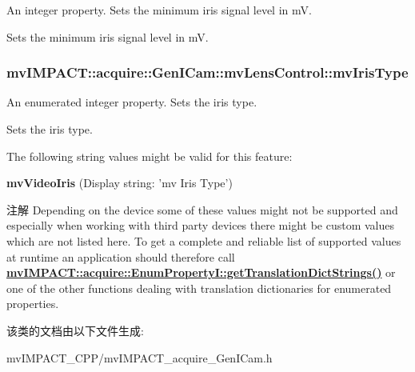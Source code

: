 An integer property. Sets the minimum iris signal level in m\+V. 

Sets the minimum iris signal level in m\+V. \hypertarget{classmv_i_m_p_a_c_t_1_1acquire_1_1_gen_i_cam_1_1mv_lens_control_a21b42a21cab10d159c5283452a8489f5}{
\subsubsection[{mv\+Iris\+Type}]{ mv\+I\+M\+P\+A\+C\+T\+::acquire\+::\+Gen\+I\+Cam\+::mv\+Lens\+Control\+::mv\+Iris\+Type}}\label{classmv_i_m_p_a_c_t_1_1acquire_1_1_gen_i_cam_1_1mv_lens_control_a21b42a21cab10d159c5283452a8489f5}


An enumerated integer property. Sets the iris type. 

Sets the iris type.

The following string values might be valid for this feature\+:
\begin{DoxyItemize}
\item {\bfseries mv\+Video\+Iris} (Display string\+: 'mv Iris Type')
\end{DoxyItemize}

\begin{DoxyNote}{注解}
Depending on the device some of these values might not be supported and especially when working with third party devices there might be custom values which are not listed here. To get a complete and reliable list of supported values at runtime an application should therefore call {\bfseries \hyperlink{classmv_i_m_p_a_c_t_1_1acquire_1_1_enum_property_i_a0ba6ccbf5ee69784d5d0b537924d26b6}{mv\+I\+M\+P\+A\+C\+T\+::acquire\+::\+Enum\+Property\+I\+::get\+Translation\+Dict\+Strings()}} or one of the other functions dealing with translation dictionaries for enumerated properties. 
\end{DoxyNote}


该类的文档由以下文件生成\+:\begin{DoxyCompactItemize}
\item 
mv\+I\+M\+P\+A\+C\+T\+\_\+\+C\+P\+P/mv\+I\+M\+P\+A\+C\+T\+\_\+acquire\+\_\+\+Gen\+I\+Cam.\+h\end{DoxyCompactItemize}
